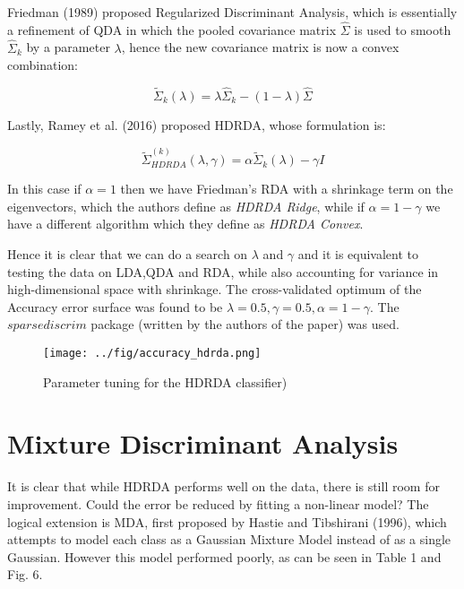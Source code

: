 \documentclass[conference,final,]{IEEEtran}
\makeatletter
\def\maxwidth{\ifdim\Gin@nat@width>\linewidth\linewidth
\else\Gin@nat@width\fi}
\let\Oldincludegraphics\includegraphics
\renewcommand{\includegraphics}[1]{\Oldincludegraphics[width=\maxwidth]{#1}}
\makeatother
\begin{document}
Friedman (1989) proposed Regularized Discriminant Analysis, which is
essentially a refinement of QDA in which the pooled covariance matrix
\(\hat \Sigma\) is used to smooth \(\hat \Sigma _k\) by a parameter
\(\lambda\), hence the new covariance matrix is now a convex
combination:

\begin{equation}
\tilde{\Sigma}_k(\lambda) = \lambda \hat \Sigma _k - (1-\lambda) \hat \Sigma
\end{equation}

Lastly, Ramey et al. (2016) proposed HDRDA, whose formulation is:

\begin{equation}
\tilde{\Sigma}_{HDRDA}^{(k)}(\lambda, \gamma) = \alpha \tilde{\Sigma}_k(\lambda) - \gamma I
\end{equation}

In this case if \(\alpha=1\) then we have Friedman's RDA with a
shrinkage term on the eigenvectors, which the authors define as
\emph{HDRDA Ridge}, while if \(\alpha=1-\gamma\) we have a different
algorithm which they define as \emph{HDRDA Convex}.

Hence it is clear that we can do a search on \(\lambda\) and \(\gamma\)
and it is equivalent to testing the data on LDA,QDA and RDA, while also
accounting for variance in high-dimensional space with shrinkage. The
cross-validated optimum of the Accuracy error surface was found to be
\(\lambda = 0.5, \gamma=0.5, \alpha=1-\gamma\). The \(sparsediscrim\)
package (written by the authors of the paper) was used.

\begin{figure}
\centering
\texttt{[image: ../fig/accuracy\_hdrda.png]}
\caption{Parameter tuning for the HDRDA classifier)}
\end{figure}

\hypertarget{mixture-discriminant-analysis}{%
\section{Mixture Discriminant
Analysis}\label{mixture-discriminant-analysis}}

It is clear that while HDRDA performs well on the data, there is still
room for improvement. Could the error be reduced by fitting a non-linear
model? The logical extension is MDA, first proposed by Hastie and
Tibshirani (1996), which attempts to model each class as a Gaussian
Mixture Model instead of as a single Gaussian. However this model
performed poorly, as can be seen in Table 1 and Fig. 6.
\end{document}
